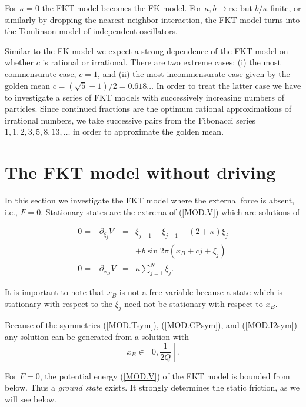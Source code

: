 For $\kappa=0$ the FKT model becomes the FK model.  For
$\kappa,b\to\infty$ but $b/\kappa$ finite, or similarly by dropping
the nearest-neighbor interaction, the FKT model turns into the
Tomlinson model of independent oscillators.

Similar to the FK model we expect a strong dependence of the FKT
model on whether $c$ is rational or irrational. There are 
two extreme cases: (i) the most commensurate case, $c=1$, and (ii)
the most incommensurate case given by the golden mean
$c=(\sqrt{5}-1)/2=0.618\ldots$ In order to treat the latter case 
we have to investigate a series of FKT models
with successively increasing numbers of particles. Since continued
fractions are the optimum rational approximations of irrational
numbers, we take successive pairs from the Fibonacci series
$1,1,2,3,5,8,13,\ldots$ in order to approximate the golden mean.

\section{\protect\label{F0}The FKT model without driving}

In this section we investigate the FKT model where the
external force is absent, i.e., $F=0$. Stationary states are the
extrema of (\ref{MOD.V}) which are solutions of
\begin{mathletters}
\label{F0.eq}
\begin{eqnarray}
 0=-\partial_{\xi_j}V&=&\xi_{j+1}+\xi_{j-1}-(2+\kappa)\xi_j
   \nonumber\\&&+b\sin 2\pi(x_B+cj+\xi_j) \label{F0.eqj}\\
 0=-\partial_{x_B}V&=&\kappa\sum_{j=1}^N\xi_j\label{F0.xisum}.
\end{eqnarray}
\end{mathletters}
It is important to note that $x_B$ is not a free variable because a
state which is stationary with respect to the $\xi_j$ need not be
stationary with respect to $x_B$.

Because of the symmetries (\ref{MOD.Tsym}), (\ref{MOD.CPsym}), and
(\ref{MOD.I2sym}) any solution can be generated from a solution
with
\begin{equation}
 x_B\in \left[0,\frac{1}{2Q}\right].
  \label{F0.xB.int}
\end{equation}

For $F=0$, the potential energy (\ref{MOD.V}) of the FKT model is
bounded from below. Thus a {\em ground state\/} exists. It strongly 
determines the static friction, as we will see below.

